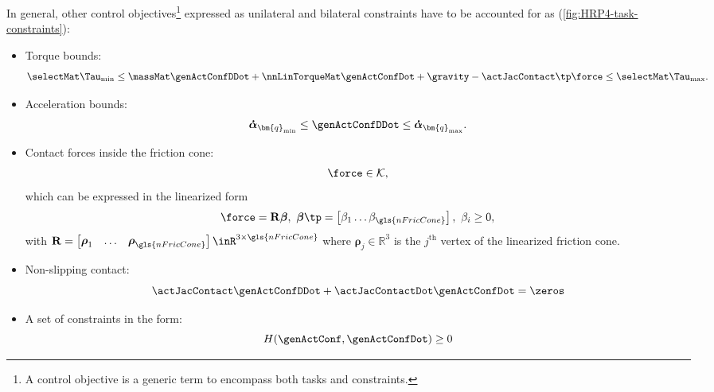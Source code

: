 In general, other control objectives\footnote{A control objective is a generic term to encompass both tasks and constraints.} expressed as unilateral and bilateral constraints have  to be accounted for as (\cref{fig:HRP4-task-constraints}):
\begin{itemize}
	\item Torque bounds: 
	\begin{equation}\label{eq-chap0:tau bounds}
		\selectMat\Tau_{\min}\leq  	\massMat\genActConfDDot + \nnLinTorqueMat\genActConfDot + \gravity - {\actJacContact}\tp\force \leq\selectMat\Tau_{\max}.
	\end{equation} 
	\item Acceleration bounds: 
	\begin{equation}\label{eq-chap0:acceleration bounds}
		\boldsymbol{\dot{\alpha}}_{{\bm{q}}_{\min}}\leq
		\genActConfDDot
		\leq\boldsymbol{\dot{\alpha}}_{{\bm{q}}_{\max}}.
	\end{equation}
	\item Contact forces inside the friction cone: 
	\begin{equation}\label{eq-chap0:force constraint}
		\force \in{\cal K}, 
	\end{equation} which can be expressed in the linearized form
	\begin{equation}\label{eq-chap0:force constraint linearized}
		\force = \mathbf{R}\boldsymbol{\beta}, \ \boldsymbol{\beta}\tp=\begin{bmatrix}\beta_1\ldots\beta_{\gls{nFricCone}}\end{bmatrix}, \ \beta_{i}\geq0,
	\end{equation}
	with $\mathbf{R}=\begin{bmatrix}
		\boldsymbol{\rho}_1 & \ldots & \boldsymbol{\rho}_{\gls{nFricCone}}
	\end{bmatrix}\inR^{3\times\gls{nFricCone}}$ where $\boldsymbol{\rho}_j\in\mathbb{R}^3$ is the $j^{\text{th}}$ vertex of the linearized friction cone.%
	\item Non-slipping contact: 
	\begin{equation}\label{eq-chap0:non-slipping contact}
		\actJacContact\genActConfDDot + \actJacContactDot \genActConfDot = \zeros
	\end{equation}
	\item A set of constraints in the form: 
	\begin{equation}\label{eq-chap0:gen form kinematic constraint}
		H(\genActConf,\genActConfDot)\geq 0 

\end{equation}
\end{itemize}

